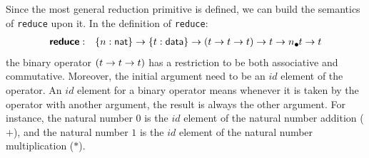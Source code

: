 \documentclass{l4proj}
\begin{document}
Since the most general reduction primitive is defined, we can build the semantics of \texttt{reduce} upon it. In the definition of \texttt{reduce}:
\begin{align}
    \prim{reduce}&:&\{\n : \natkind\} \to \{\dt : \datatype\} \to (\dt \to \dt \to \dt) \to \dt \to \lArray{\n}{\dt} \to \dt
\end{align}
the binary operator $(t \to t \to t)$ has a restriction to be both associative and commutative. Moreover, the initial argument need to be an $id$ element of the operator. An $id$ element for a binary operator means whenever it is taken by the operator with another argument, the result is always the other argument. For instance, the natural number $0$ is the $id$ element of the natural number addition ($+$), and the natural number $1$ is the $id$ element of the natural number multiplication ($*$).
\end{document}
